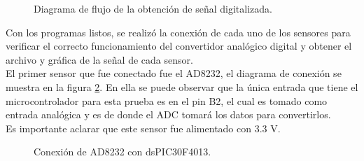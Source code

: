 	\begin{figure}[htbp!]
		\centering
		\caption{Diagrama de flujo de la obtención de señal digitalizada.}
		\label{fig:FlujoSerial}
	\end{figure}
\pagebreak
		
Con los programas listos, se realizó la conexión de cada uno de los sensores para verificar el  correcto funcionamiento del convertidor analógico digital y obtener el archivo y gráfica de la señal de cada sensor.\\

El primer sensor que fue conectado fue el AD8232, el diagrama de conexión se muestra en la figura \ref{fig:ConexionAD8232}. En ella se puede observar que la única entrada que tiene el microcontrolador para esta prueba es en el pin B2, el cual es tomado como entrada analógica y es de donde el ADC tomará los datos para convertirlos.\\

Es importante aclarar que este sensor fue alimentado con 3.3 V.\\

	\begin{figure}[htbp!]
		\centering
		\caption{Conexión de AD8232 con dsPIC30F4013.}
		\label{fig:ConexionAD8232}
	\end{figure}
	
